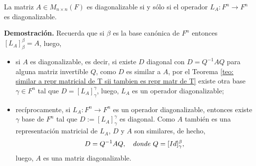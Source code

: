 \begin{cor} La matriz
$A \in M_{n \times n}(F)$ es diagonalizable si y sólo si 
el operador
$L_{A}: F^{n} \longrightarrow F^{n}$ es diagonalizable.
\end{cor}
\noindent
\textbf{Demostración.}
Recuerda que si 
$\beta$ es la base canónica de $F^{n}$ entonces 
$[L_{A}]_{\beta}^{\beta} = A$, luego, 
\begin{itemize}
	\item si $A$ es diagonalizable, es decir, si 
	existe $D$ diagonal con $D = Q^{-1} A Q$ para alguna matriz
	invertible $Q$,
como $D$ es similar a $A$, por el Teorema
\ref{teo: similar a repr matricial de T sii tambien es repr matr de T}
existe otra base $\gamma \in F^{n}$ tal que
$D = [L_{A}]_{\gamma}^{\gamma}$, luego, $L_{A}$ es un operador
diagonalizable;
	\item recíprocamente, si $L_{A}: F^{n} \longrightarrow F^{n}$ es un operador
diagonalizable, entonces existe $\gamma$ base de $F^{n}$
tal que $D := [L_{A}]_{\gamma}^{\gamma}$ es diagonal. Como $A$
también es una representación matricial de $L_{A}$, $D$ y 
$A$ son similares, de hecho,
\[
D = Q^{-1} A Q, \hspace{0.2cm} \textit{ donde }
Q = [Id]_{\gamma}^{\beta},
\]
luego, $A$ es una matriz diagonalizable.
\end{itemize}
\QEDB
\vspace{0.2cm}


